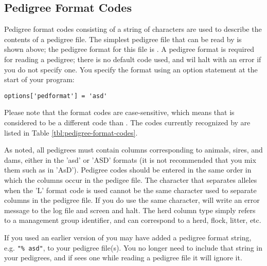 \subsection{Pedigree Format Codes}
\label{sec:pedigree-format-codes}
Pedigree format codes consisting of a string of characters are used to describe
the contents of a pedigree file.  The simplest pedigree file that can be read by \PyPedal{}
is shown above; the pedigree format for this file is .  A pedigree format is required
for reading a pedigree; there is no default code used, and \PyPedal{} wil halt with an error if you
do not specify one.  You specify the format using an option statement at the start of your program:
\begin{verbatim}
options['pedformat'] = 'asd'
\end{verbatim}
Please note that the format codes are case-sensitive, which means that  is considered to be a different code than .  The codes currently recognized by \PyPedal{} are listed in Table \ref{tbl:pedigree-format-codes}.

As noted, all pedigrees must contain columns corresponding to animals, sires, and dams, either in the 'asd' or 'ASD' formats (it is not recommended that you mix them such as in 'AsD').  Pedigree codes should be entered in the same order in which the columns occur in the pedigee file.  The character that separates alleles when the 'L' format code is used cannot be the same character used to separate columns in the pedigree file.  If you do use the same character, \PyPedal{} will write an error message to the log file and screen and halt.  The herd column type simply refers to a management group identifier, and can
correspond to a herd, flock, litter, etc.

If you used an earlier version of \PyPedal{} you may have added a pedigree format string, e.g. \texttt{"\% asd"}, to your pedigree file(s).  You no longer need to include that string in your pedigrees, and if \PyPedal{} sees one while reading a pedigree file it will ignore it.

